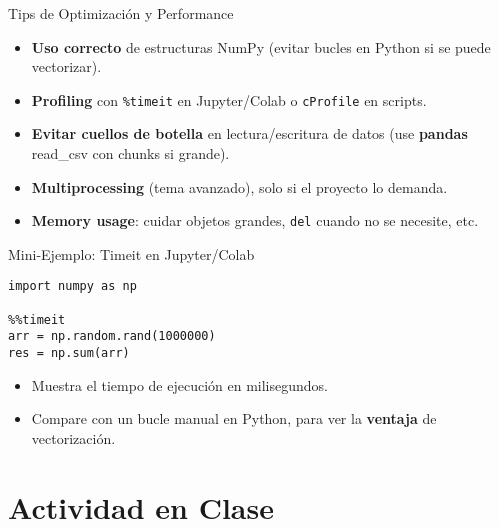 \documentclass[10pt]{beamer}
\begin{document}
\begin{frame}{Tips de Optimización y Performance}
  \begin{itemize}
    \item \textbf{Uso correcto} de estructuras NumPy (evitar bucles en Python si se puede vectorizar).
    \item \textbf{Profiling} con \texttt{\%timeit} en Jupyter/Colab o \texttt{cProfile} en scripts.
    \item \textbf{Evitar cuellos de botella} en lectura/escritura de datos (use \textbf{pandas} read_csv con chunks si grande).
    \item \textbf{Multiprocessing} (tema avanzado), solo si el proyecto lo demanda.
    \item \textbf{Memory usage}: cuidar objetos grandes, \texttt{del} cuando no se necesite, etc.
  \end{itemize}
\end{frame}

\begin{frame}[fragile]{Mini-Ejemplo: Timeit en Jupyter/Colab}
\begin{verbatim}
import numpy as np

%%timeit
arr = np.random.rand(1000000)
res = np.sum(arr)
\end{verbatim}

\begin{itemize}
  \item Muestra el tiempo de ejecución en milisegundos.
  \item Compare con un bucle manual en Python, para ver la \textbf{ventaja} de vectorización.
\end{itemize}
\end{frame}

\section{Actividad en Clase}
\end{document}
